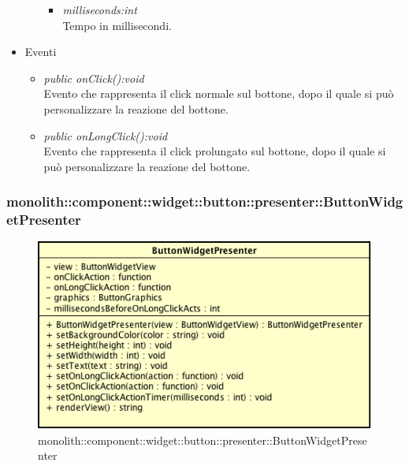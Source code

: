 \begin{itemize}
\begin{itemize}
{\begin{itemize}
				\item \textit{milliseconds:int}\\
				Tempo in millisecondi.
	\end{itemize}}
	\end{itemize}
\item{Eventi}
	\begin{itemize}
	\item \textit{public onClick():void}\\
	Evento che rappresenta il click normale sul bottone, dopo il quale si può personalizzare la reazione del bottone.
	\item \textit{public onLongClick():void}\\
	Evento che rappresenta il click prolungato sul bottone, dopo il quale si può personalizzare la reazione del bottone.
	\end{itemize}
\end{itemize}

\subsubsection{monolith::component::widget::button::presenter::ButtonWidgetPresenter}

\label{monolith::component::widget::button::presenter::ButtonWidgetPresenter}
\begin{figure}[ht]
	\centering
	\includegraphics[scale=0.5]{Sezioni/SottosezioniST/img/ButtonWidgetPresenter.png}
	\caption{monolith::component::widget::button::presenter::ButtonWidgetPresenter}
\end{figure}

